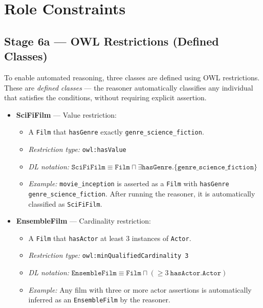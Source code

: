 \chapter{Role Constraints}

\section*{Stage 6a — OWL Restrictions (Defined Classes)}

To enable automated reasoning, three classes are defined using OWL restrictions. These are \textit{defined classes} — the reasoner automatically classifies any individual that satisfies the conditions, without requiring explicit assertion.

\begin{itemize}
    \item \textbf{SciFiFilm} — Value restriction:
    \begin{itemize}
        \item A \texttt{Film} that \texttt{hasGenre} exactly \texttt{genre\_science\_fiction}.
        \item \textit{Restriction type:} \texttt{owl:hasValue}
        \item \textit{DL notation:} $\texttt{SciFiFilm} \equiv \texttt{Film} \sqcap \exists\texttt{hasGenre}.\{\texttt{genre\_science\_fiction}\}$
        \item \textit{Example:} \texttt{movie\_inception} is asserted as a \texttt{Film} with \texttt{hasGenre genre\_science\_fiction}. After running the reasoner, it is automatically classified as \texttt{SciFiFilm}.
    \end{itemize}

    \item \textbf{EnsembleFilm} — Cardinality restriction:
    \begin{itemize}
        \item A \texttt{Film} that \texttt{hasActor} at least 3 instances of \texttt{Actor}.
        \item \textit{Restriction type:} \texttt{owl:minQualifiedCardinality 3}
        \item \textit{DL notation:} $\texttt{EnsembleFilm} \equiv \texttt{Film} \sqcap (\geq 3\ \texttt{hasActor}.\texttt{Actor})$
        \item \textit{Example:} Any film with three or more actor assertions is automatically inferred as an \texttt{EnsembleFilm} by the reasoner.
    \end{itemize}


\end{itemize}
